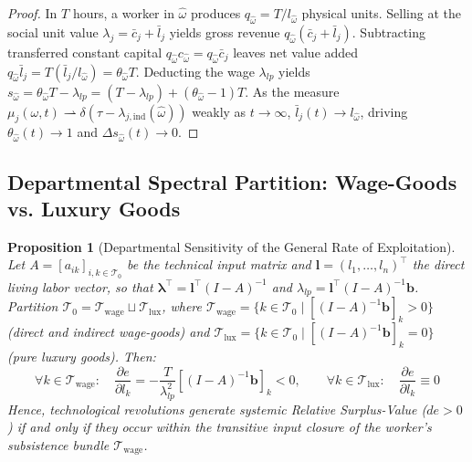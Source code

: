 \documentclass[11pt,a4paper]{article}
\newtheorem{proposition}{Proposition}[section]
\begin{document}
\begin{proof}
In $T$ hours, a worker in $\hat{\omega}$ produces $q_{\hat{\omega}} = T / l_{\hat{\omega}}$ physical units. Selling at the social unit value $\lambda_j = \bar{c}_j + \bar{l}_j$ yields gross revenue $q_{\hat{\omega}}(\bar{c}_j + \bar{l}_j)$. Subtracting transferred constant capital $q_{\hat{\omega}} c_{\hat{\omega}} = q_{\hat{\omega}} \bar{c}_j$ leaves net value added $q_{\hat{\omega}} \bar{l}_j = T (\bar{l}_j / l_{\hat{\omega}}) = \theta_{\hat{\omega}} T$. Deducting the wage $\lambda_{lp}$ yields $s_{\hat{\omega}} = \theta_{\hat{\omega}} T - \lambda_{lp} = (T - \lambda_{lp}) + (\theta_{\hat{\omega}} - 1)T$. As the measure $\mu_j(\omega, t) \rightharpoonup \delta(\tau - \lambda_{j,\text{ind}}(\hat{\omega}))$ weakly as $t \to \infty$, $\bar{l}_j(t) \to l_{\hat{\omega}}$, driving $\theta_{\hat{\omega}}(t) \to 1$ and $\Delta s_{\hat{\omega}}(t) \to 0$.
\end{proof}

\subsection{Departmental Spectral Partition: Wage-Goods vs. Luxury Goods}

\begin{proposition}[Departmental Sensitivity of the General Rate of Exploitation]
Let $A = [a_{ik}]_{i,k \in \mathcal{T}_0}$ be the technical input matrix and $\mathbf{l} = (l_1, \dots, l_n)^\top$ the direct living labor vector, so that $\boldsymbol{\lambda}^\top = \mathbf{l}^\top (I - A)^{-1}$ and $\lambda_{lp} = \mathbf{l}^\top (I - A)^{-1} \mathbf{b}$. Partition $\mathcal{T}_0 = \mathcal{T}_{\text{wage}} \sqcup \mathcal{T}_{\text{lux}}$, where $\mathcal{T}_{\text{wage}} = \{k \in \mathcal{T}_0 \mid [(I - A)^{-1}\mathbf{b}]_k > 0\}$ (direct and indirect wage-goods) and $\mathcal{T}_{\text{lux}} = \{k \in \mathcal{T}_0 \mid [(I - A)^{-1}\mathbf{b}]_k = 0\}$ (pure luxury goods). Then:
\begin{equation}
    \forall k \in \mathcal{T}_{\text{wage}}: \quad \frac{\partial e}{\partial l_k} = -\frac{T}{\lambda_{lp}^2} \left[(I - A)^{-1}\mathbf{b}\right]_k < 0, \qquad \forall k \in \mathcal{T}_{\text{lux}}: \quad \frac{\partial e}{\partial l_k} \equiv 0
\end{equation}
Hence, technological revolutions generate systemic Relative Surplus-Value ($de > 0$) if and only if they occur within the transitive input closure of the worker's subsistence bundle $\mathcal{T}_{\text{wage}}$.
\end{proposition}
\end{document}
